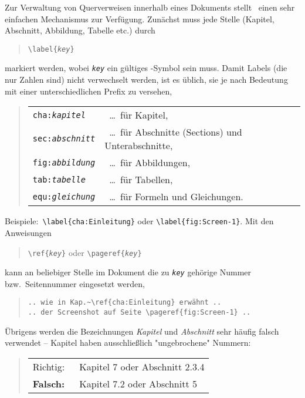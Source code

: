 Zur Verwaltung von Querverweisen innerhalb eines Dokuments stellt \latex\
einen sehr einfachen Mechanismus zur Verfügung. Zunächst muss jede Stelle
(Kapitel, Abschnitt, Abbildung, Tabelle etc.) durch
%
\begin{quote}
    \verb!\label{!\texttt{\em key}\verb!}!
\end{quote}
%
markiert werden, wobei \texttt{\em key} ein gültiges \latex-Symbol sein muss.
Damit Labels (die nur Zahlen sind) nicht verwechselt werden, ist es üblich,
sie je nach Bedeutung mit einer unterschiedlichen Prefix zu versehen, \zB\
%
\begin{quote}
    \begin{tabular}{ll}
        \verb!cha:!\texttt{\em kapitel} & \ \ldots\ für Kapitel,
        \\
        \verb!sec:!\texttt{\em abschnitt} & \ \ldots\ für Abschnitte
        (Sections) und Unterabschnitte,
        \\
        \verb!fig:!\texttt{\em abbildung} & \ \ldots\ für Abbildungen,
        \\
        \verb!tab:!\texttt{\em tabelle} & \ \ldots\ für Tabellen,
        \\
        \verb!equ:!\texttt{\em gleichung} & \ \ldots\ für Formeln und
        Gleichungen.
    \end{tabular}
\end{quote}
%
\noindent
Beispiele:\ \verb!\label{cha:Einleitung}! oder \verb!\label{fig:Screen-1}!.
Mit den Anweisungen
%
\begin{quote}
    \verb!\ref{!\texttt{\emph{key}}\verb!}!
    \hspace{1em} oder \hspace{1em}
    \verb!\pageref{!\texttt{\emph{key}}\verb!}!
\end{quote}
%
kann an beliebiger Stelle im Dokument die zu \texttt{\emph{key}} gehörige
Nummer bzw.\ Seitennummer eingesetzt werden, \zB\
%
\begin{quote}
    \verb!.. wie in Kap.~\ref{cha:Einleitung} erwähnt ..!\\
    \verb!.. der Screenshot auf Seite \pageref{fig:Screen-1} ..!
\end{quote}
%
Übrigens werden die Bezeichnungen \emph{Kapitel} und \emph{Abschnitt} sehr
häufig falsch verwendet -- Kapitel haben ausschließlich "ungebrochene" Nummern:
%
\begin{quote}
    \begin{tabular}{ll}
        \textrm{Richtig:\ } & Kapitel 7 oder Abschnitt 2.3.4 \\
        \textbf{Falsch:\ }  & Kapitel 7.2 oder Abschnitt 5
    \end{tabular}
\end{quote}

